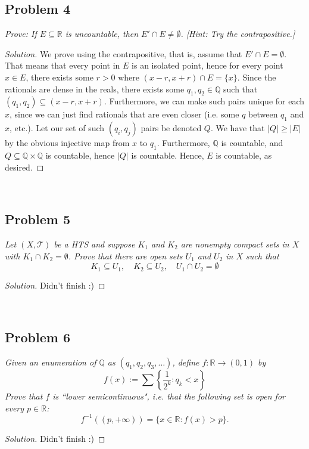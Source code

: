 \documentclass{article}
\newcommand{\Q}{{\mathbb Q}}
\newcommand{\R}{{\mathbb R}}
\begin{document}
\subsection*{Problem 4}
{\it Prove: If $E \subseteq \R$ is uncountable, then $E' \cap E \neq \emptyset$.
[Hint: Try the contrapositive.]}

\begin{proof}[Solution]\let\qed\relax
	We prove using the contrapositive,
	that is, assume that $E' \cap E = \emptyset$.
	That means that every point in $E$ is an isolated point,
	hence for every point $x \in E$,
	there exists some $r>0$ where $(x-r, x+r) \cap E = \{x\}$.
	Since the rationals are dense in the reals, there exists some $q_1,q_2 \in \Q$
	such that $(q_1,q_2) \subseteq (x-r, x+r)$.
	Furthermore, we can make such pairs unique for each $x$,
	since we can just find rationals that are even closer
	(i.e. some $q$ between $q_1$ and $x$, etc.).
	Let our set of such $(q_i,q_j)$ pairs be denoted $Q$.
	We have that $|Q|\geq |E|$ by the obvious injective map from $x$
	to $q_1$.
	Furthermore, $\Q$ is countable, and $Q \subseteq \Q \times \Q$
	is countable,
	hence $|Q|$ is countable.
	Hence, $E$ is countable, as desired.
\end{proof}
\clearpage
~\clearpage

\subsection*{Problem 5}
{\it Let $(X,\mathcal{T})$ be a HTS and suppose $K_1$ and $K_2$
are nonempty compact sets in $X$ with $K_1 \cap K_2 = \emptyset$.
Prove that there are open sets $U_1$ and $U_2$ in $X$ such that
\[
	K_1 \subseteq U_1, \quad K_2 \subseteq U_2, \quad U_1 \cap U_2 = \emptyset
\]}

\begin{proof}[Solution]\let\qed\relax
	Didn't finish :)
\end{proof}
\clearpage
~\clearpage

\subsection*{Problem 6}
{\it Given an enumeration of $\Q$ as $(q_1,q_2,q_3,\dots)$, define
$f \colon \R \to (0,1)$ by
\[
	f(x) := \sum\left\{\frac{1}{2^k} \colon q_k < x\right\}
\]
Prove that $f$ is ``lower semicontinuous", i.e. that the
following set is open for every $p \in \R$:
\[
	f^{-1}((p,+\infty)) = \{x \in \R \colon f(x) > p\}.
\]}

\begin{proof}[Solution]\let\qed\relax
	Didn't finish :)
\end{proof}
\clearpage
~\clearpage
\end{document}
